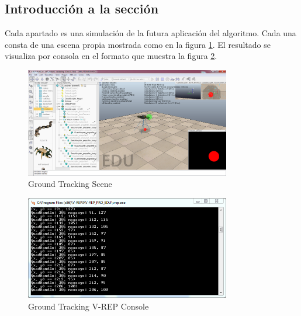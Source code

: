 \subsection{Introducci\'on a la secci\'on}
Cada apartado es una simulaci\'on de la futura aplicaci\'on del algoritmo. Cada una consta de una escena propia mostrada como en la figura \ref{fig:VREP_scene_example}. El resultado se visualiza por consola en el formato que muestra la figura \ref{fig:Ground_Tracking_VREP_Console}. \\

\begin{figure}[ht]
	\centering
	\includegraphics[width=0.8\textwidth,natwidth=1366,natheight=728]{../Images/c3/ground_tracking_scene.png}
	\caption{Ground Tracking Scene}
	\label{fig:VREP_scene_example}
\end{figure}

\begin{figure}[ht]
	\centering
	\includegraphics[width=0.8\textwidth,natwidth=677,natheight=342]{../Images/c3/ground_tracking_vrep_console.png}
	\caption{Ground Tracking V-REP Console}
	\label{fig:Ground_Tracking_VREP_Console}
\end{figure}

